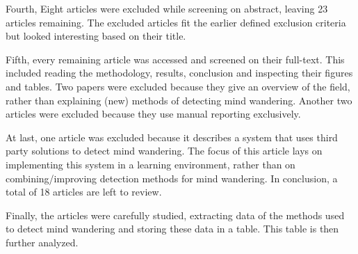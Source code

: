 Fourth, Eight articles were excluded while screening on abstract, leaving 23 articles remaining. 
The excluded articles fit the earlier defined exclusion criteria but looked interesting based on their title.

Fifth, every remaining article was accessed and screened on their full-text. This included reading the methodology, results, conclusion and inspecting their figures and tables.
Two papers were excluded because they give an overview of the field, rather than explaining (new) methods of detecting mind wandering. 
Another two articles were excluded because they use manual reporting exclusively.

At last, one article was excluded because it describes a system that uses third party solutions to detect mind wandering. The focus of this article lays on implementing this system in a learning environment, rather than on combining/improving detection methods for mind wandering.
In conclusion, a total of 18 articles are left to review.

Finally, the articles were carefully studied, extracting data of the methods used to detect mind wandering and storing these data in a table. This table is then further analyzed.
